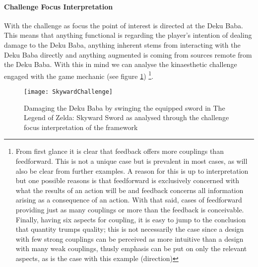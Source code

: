 \paragraph{Challenge Focus Interpretation}
With the challenge as focus the point of interest is directed at the Deku Baba. This means that anything functional is regarding the player's intention of dealing damage to the Deku Baba, anything inherent stems from interacting with the Deku Baba directly and anything augmented is coming from sources remote from the Deku Baba. With this in mind we can analyse the kinaesthetic challenge engaged with the game mechanic (see figure \ref{SkywardChallenge}) \footnote{From first glance it is clear that feedback offers more couplings than feedforward. This is not a unique case but is prevalent in most cases, as will also be clear from further examples. A reason for this is up to interpretation but one possible reasons is that feedforward is exclusively concerned with what the results of an action will be and feedback concerns all information arising as a consequence of an action. With that said, cases of feedforward providing just as many couplings or more than the feedback is conceivable. Finally, having six aspects for coupling, it is easy to jump to the conclusion that quantity trumps quality; this is not necessarily the case since a design with few strong couplings can be perceived as more intuitive than a design with many weak couplings, thusly emphasis can be put on only the relevant aspects, as is the case with this example (direction)}.

\begin{figure}[h]
  \texttt{[image: SkywardChallenge]}
  \caption{Damaging the Deku Baba by swinging the equipped sword in The Legend of Zelda: Skyward Sword as analysed through the challenge focus interpretation of the framework}
  \label{SkywardChallenge}
\end{figure}

